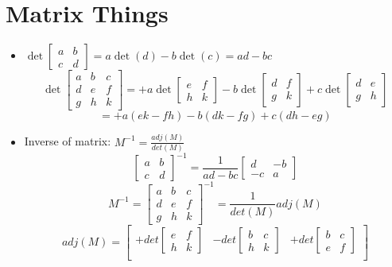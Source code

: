 \section*{Matrix Things}
\begin{itemize}
    \item \(\det\begin{bmatrix}
              a & b \\ c & d
          \end{bmatrix} = a\det(d)-b\det(c) =ad-bc\)
          \[\det\begin{bmatrix}
                  a & b & c \\ d & e & f \\ g & h & k
              \end{bmatrix}= +a
              \det\begin{bmatrix}
                  e & f \\ h & k
              \end{bmatrix}-b
              \det\begin{bmatrix}
                  d & f \\ g & k
              \end{bmatrix}+c
              \det\begin{bmatrix}
                  d & e \\ g & h
              \end{bmatrix}\]
          \[
              =+a(ek-fh)-b(dk-fg)+c(dh-eg)
          \]
    \item Inverse of matrix: \(M^{-1}=\frac{adj(M)}{det(M)}\)
          \[\begin{bmatrix}
                  a & b \\ c & d
              \end{bmatrix}^{-1}=\frac{1}{ad-bc}
              \begin{bmatrix}
                  d & -b \\ -c & a
              \end{bmatrix}
          \]
          \[
              M^{-1}=
              \begin{bmatrix}
                  a & b & c \\ d & e & f\\ g & h &k
              \end{bmatrix}^{-1}=
              \frac{1}{det(M)}adj(M)
          \]
          \[
              adj(M)=
              \begin{bmatrix}
                  +det\begin{bmatrix}e & f \\ h & k\end{bmatrix}  & -det\begin{bmatrix}b & c \\ h & k\end{bmatrix} & +det\begin{bmatrix}b & c \\ e & f\end{bmatrix} \\

\end{bmatrix}\]
\end{itemize}
